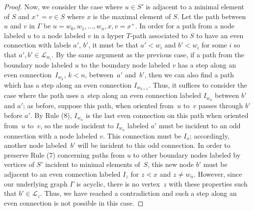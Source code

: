 \documentclass[10pt,a4paper]{amsart}
\numberwithin{equation}{section}
\newcommand{\new}[1]{{#1}}
\begin{document}
\begin{proof}
Now, we consider the case where $u \in S'$ is adjacent to a minimal element of $S$ and $x^+ = v \in S$ where $x$ is the maximal element of $S$. Let the path between $u$ and $v$ in $\Gamma$ be $u = w_0, w_1,\ldots, w_n, x, v = x^+$. In order for a path from a node labeled $u$ to a node labeled $v$ in a hyper $T$-path associated to $S$ to have an even connection with labels $a'$, $b'$, it must be that $a' < w_i$ and $b' < w_i$ for some $i$ so that $a',b' \in \mathcal{L}_{w_i}$. By the same argument as the previous case, if a path from the boundary node labeled $u$ to the boundary node labeled $v$ has a step along an even connection~$I_{w_k}$, $k < n$, between~$a'$ and~$b'$, then we can also find a path which has a step along an even connection $I_{w_{k+1}}$. Thus, it suffices to consider the case where the path uses a~step along an even connection labeled $I_{w_n}$ between $b'$ and $a'$; as before, suppose this path, when oriented from~$u$ to~$v$ passes through $b'$ before $a'$. By Rule (8), $I_{w_n}$ is the last even connection on this path when oriented from~$u$ to~$v$, so the node incident to \new{$I_{w_n}$} labeled $a'$ must be incident to an odd connection with a node labeled $v$. This connection must be $I_x$; accordingly, another node labeled~$b'$ will be incident to this odd connection. In order to preserve Rule (7) concerning paths from $u$ to other boundary nodes labeled by vertices of $S'$ incident to minimal elements of~$S$, this new node $b'$ must be adjacent to an even connection labeled $I_z$ for $z \lessdot x$ and $z \neq w_{n}$. However, since our underlying graph $\Gamma$ is acyclic, there is no vertex~$z$ with these properties such that $b' \in \mathcal{L}_z$. Thus, we have reached a contradiction and such a step along an even connection is not possible in this case.
\end{proof}
\end{document}
